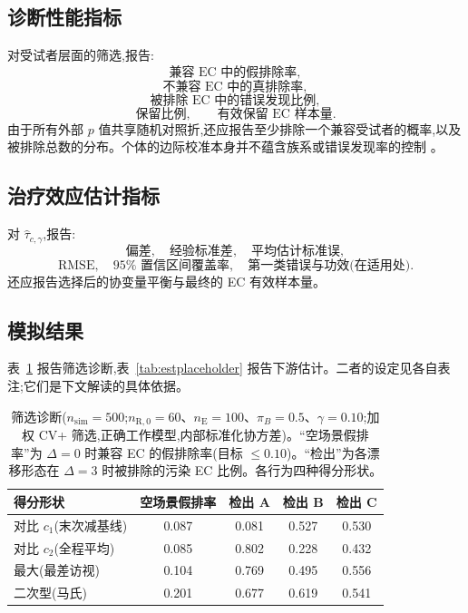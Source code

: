 \documentclass[11pt]{article}
\newcommand{\R}{\mathrm{R}}
\newcommand{\E}{\mathrm{E}}
\begin{document}
\subsection{诊断性能指标}

对受试者层面的筛选,报告:
\[
\text{兼容 EC 中的假排除率},
\]
\[
\text{不兼容 EC 中的真排除率},
\]
\[
\text{被排除 EC 中的错误发现比例},
\]
\[
\text{保留比例},
\qquad
\text{有效保留 EC 样本量}.
\]
由于所有外部 $p$ 值共享随机对照折,还应报告至少排除一个兼容受试者的概率,以及被排除总数的分布。个体的边际校准本身并不蕴含族系或错误发现率的控制 \citep{bates2023outliers}。

\subsection{治疗效应估计指标}

对 $\widehat\tau_{c,\gamma}$,报告:
\[
\text{偏差},\quad
\text{经验标准差},\quad
\text{平均估计标准误},
\]
\[
\text{RMSE},\quad
95\%\text{ 置信区间覆盖率},\quad
\text{第一类错误与功效(在适用处)}.
\]
还应报告选择后的协变量平衡与最终的 EC 有效样本量。

\subsection{模拟结果}

表~\ref{tab:diagplaceholder} 报告筛选诊断,表~\ref{tab:estplaceholder} 报告下游估计。二者的设定见各自表注;它们是下文解读的具体依据。

\begin{table}[ht]
\centering
\caption{筛选诊断($n_{\mathrm{sim}}=500$;$n_{\R,0}=60$、$n_{\E}=100$、$\pi_B=0.5$、$\gamma=0.10$;加权 CV+ 筛选,正确工作模型,内部标准化协方差)。``空场景假排率''为 $\Delta=0$ 时兼容 EC 的假排除率(目标 $\le 0.10$)。``检出''为各漂移形态在 $\Delta=3$ 时被排除的污染 EC 比例。各行为四种得分形状。}
\begin{tabular}{lcccc}
\toprule
得分形状 & 空场景假排率 & 检出 A & 检出 B & 检出 C \\
\midrule
对比 $c_1$(末次减基线) & 0.087 & 0.081 & 0.527 & 0.530 \\
对比 $c_2$(全程平均)   & 0.085 & 0.802 & 0.228 & 0.432 \\
最大(最差访视)         & 0.104 & 0.769 & 0.495 & 0.556 \\
二次型(马氏)           & 0.201 & 0.677 & 0.619 & 0.541 \\
\bottomrule
\end{tabular}
\label{tab:diagplaceholder}
\end{table}
\end{document}
